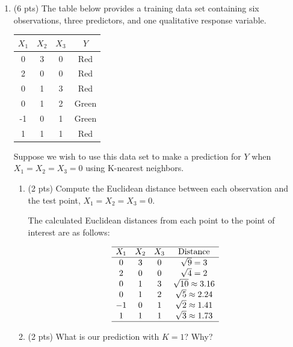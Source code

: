 \documentclass[a4paper]{article}
\theoremstyle{definition}
\newenvironment{soln}{
    \leavevmode\color{blue}\ignorespaces
}{}
\begin{document}
\begin{enumerate}
\begin{enumerate}
\end{enumerate}

\item (6 pts) The table below provides a training data set containing six observations, three predictors, and one qualitative response variable.

\begin{center}
	\begin{tabular}{ c  c  c  c}
		\hline
		$X_{1}$ & $X_{2}$ & $X_{3}$ & $Y$ \\ \hline
		0 & 3 & 0 & Red \\
		2 & 0 & 0 & Red \\
		0 & 1 & 3 & Red \\
		0 & 1 & 2 & Green \\
		-1 & 0 & 1 & Green \\
		1 & 1 & 1 & Red  \\
		\hline
	\end{tabular}
\end{center}

Suppose we wish to use this data set to make a prediction for $Y$ when $X_{1} = X_{2} = X_{3} = 0$ using K-nearest neighbors.

\begin{enumerate}
	\item (2 pts) Compute the Euclidean distance between each observation and the test point, $X_{1} = X_{2} = X_{3}=0$.
 
	\begin{soln}  The calculated Euclidean distances from each point to the point of interest are as follows:

		$$
		\begin{array}{cccc}
		\hline
		X_{1} & X_{2} & X_{3} & \text{Distance} \\
		\hline
		0 & 3 & 0 & \sqrt{9} = 3 \\
		2 & 0 & 0 & \sqrt{4} = 2 \\
		0 & 1 & 3 & \sqrt{10} \approx 3.16 \\
		0 & 1 & 2 & \sqrt{5} \approx 2.24 \\
		-1 & 0 & 1 & \sqrt{2} \approx 1.41 \\
		1 & 1 & 1 & \sqrt{3} \approx 1.73 \\
		\hline
		\end{array}
		$$
	
	\end{soln}
 
	\item (2 pts) What is our prediction with $K=1$? Why?
	

\end{enumerate}
\end{enumerate}
\end{document}
